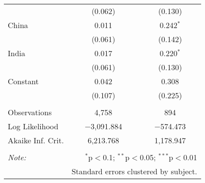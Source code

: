\begin{table}[!htbp]
\begin{tabular}{@{\extracolsep{5pt}}lcc}
  & (0.062) & (0.130) \\ 
  China & 0.011 & 0.242$^{*}$ \\ 
  & (0.061) & (0.142) \\ 
  India & 0.017 & 0.220$^{*}$ \\ 
  & (0.061) & (0.130) \\ 
  Constant & 0.042 & 0.308 \\ 
  & (0.107) & (0.225) \\ 
 \hline \\[-1.8ex] 
Observations & 4,758 & 894 \\ 
Log Likelihood & $-$3,091.884 & $-$574.473 \\ 
Akaike Inf. Crit. & 6,213.768 & 1,178.947 \\ 
\hline 
\hline \\[-1.8ex] 
\textit{Note:}  & \multicolumn{2}{r}{$^{*}$p$<$0.1; $^{**}$p$<$0.05; $^{***}$p$<$0.01} \\ 
 & \multicolumn{2}{r}{Standard errors clustered by subject.} \\ 
\end{tabular} 
\end{table} 
